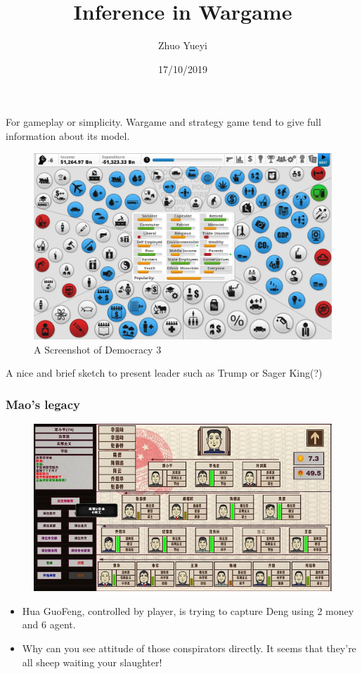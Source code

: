 \documentclass{beamer}
\title{Inference in Wargame}
\author{Zhuo Yueyi}
\institute[NUST]{}
\date{17/10/2019}
\begin{document}
\frame{\titlepage}

\begin{frame}

For gameplay or simplicity. Wargame and strategy game tend to give full information about its model.

\begin{figure}[htb]
    \centering
    \includegraphics[width=0.7\linewidth]{dd3.jpg}
    \caption{A Screenshot of Democracy 3}
\end{figure}

A nice and brief sketch to present leader such as Trump or Sager King(?)

\end{frame}

\begin{frame}

\frametitle{Mao's legacy}

    \begin{figure}[htb]
        \centering
        \includegraphics[width=0.7\linewidth]{mao_legacy.png}
    \end{figure}    

\begin{itemize}

\item Hua GuoFeng, controlled by player, is trying to capture Deng using 2 money and 6 agent.

\item Why can you see attitude of those conspirators directly. It seems that they're all sheep waiting your slaughter! 

\end{itemize}

\end{frame}
\end{document}
